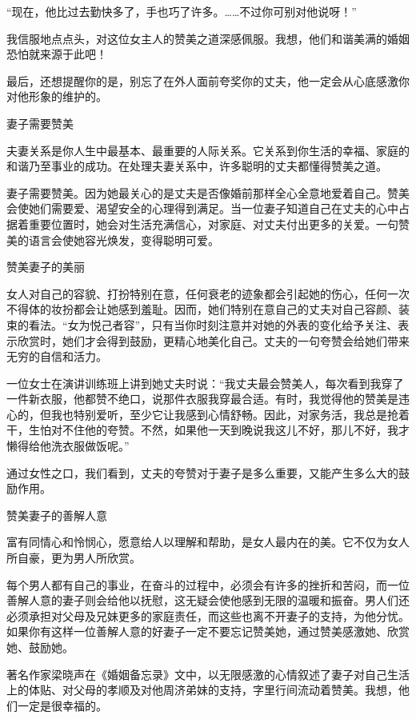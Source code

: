 \documentclass[12pt,UTF8,openany]{ctexbook}
\begin{document}
“现在，他比过去勤快多了，手也巧了许多。……不过你可别对他说呀！”

我信服地点点头，对这位女主人的赞美之道深感佩服。我想，他们和谐美满的婚姻恐怕就来源于此吧！

最后，还想提醒你的是，别忘了在外人面前夸奖你的丈夫，他一定会从心底感激你对他形象的维护的。





妻子需要赞美


夫妻关系是你人生中最基本、最重要的人际关系。它关系到你生活的幸福、家庭的和谐乃至事业的成功。在处理夫妻关系中，许多聪明的丈夫都懂得赞美之道。

妻子需要赞美。因为她最关心的是丈夫是否像婚前那样全心全意地爱着自己。赞美会使她们需要爱、渴望安全的心理得到满足。当一位妻子知道自己在丈夫的心中占据着重要位置时，她会对生活充满信心，对家庭、对丈夫付出更多的关爱。一句赞美的语言会使她容光焕发，变得聪明可爱。





赞美妻子的美丽


女人对自己的容貌、打扮特别在意，任何衰老的迹象都会引起她的伤心，任何一次不得体的妆扮都会让她感到羞耻。因而，她们特别在意自己的丈夫对自己容颜、装束的看法。“女为悦己者容”，只有当你时刻注意并对她的外表的变化给予关注、表示欣赏时，她们才会得到鼓励，更精心地美化自己。丈夫的一句夸赞会给她们带来无穷的自信和活力。

一位女士在演讲训练班上讲到她丈夫时说：“我丈夫最会赞美人，每次看到我穿了一件新衣服，他都赞不绝口，说那件衣服我穿最合适。有时，我觉得他的赞美是违心的，但我也特别爱听，至少它让我感到心情舒畅。因此，对家务活，我总是抢着干，生怕对不住他的夸赞。不然，如果他一天到晚说我这儿不好，那儿不好，我才懒得给他洗衣服做饭呢。”

通过女性之口，我们看到，丈夫的夸赞对于妻子是多么重要，又能产生多么大的鼓励作用。





赞美妻子的善解人意


富有同情心和怜悯心，愿意给人以理解和帮助，是女人最内在的美。它不仅为女人所自豪，更为男人所欣赏。

每个男人都有自己的事业，在奋斗的过程中，必须会有许多的挫折和苦闷，而一位善解人意的妻子则会给他以抚慰，这无疑会使他感到无限的温暖和振奋。男人们还必须承担对父母及兄妹更多的家庭责任，而这些也离不开妻子的支持，为他分忧。如果你有这样一位善解人意的好妻子一定不要忘记赞美她，通过赞美感激她、欣赏她、鼓励她。

著名作家梁晓声在《婚姻备忘录》文中，以无限感激的心情叙述了妻子对自己生活上的体贴、对父母的孝顺及对他周济弟妹的支持，字里行间流动着赞美。我想，他们一定是很幸福的。
\end{document}
